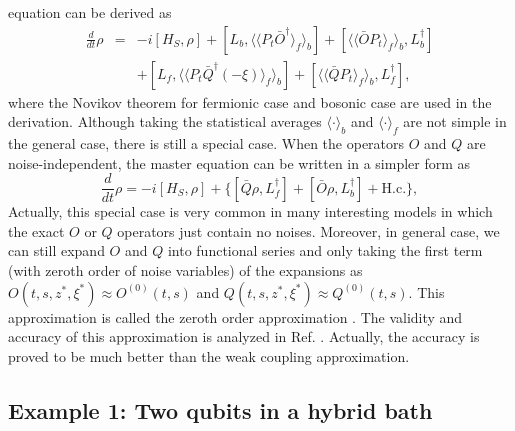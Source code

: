 \documentclass[preprint]{elsarticle}
\begin{document}
equation can be derived as
\begin{eqnarray}
\frac{d}{dt}\rho & = & -i[H_{S},\rho]+[L_{b},\langle\langle P_{t}\bar{O}^{\dagger}\rangle_{f}\rangle_{b}]+[\langle\langle\bar{O}P_{t}\rangle_{f}\rangle_{b},L_{b}^{\dagger}]\nonumber \\
 &  & +[L_{f},\langle\langle P_{t}\bar{Q}^{\dagger}(-\xi)\rangle_{f}\rangle_{b}]+[\langle\langle\bar{Q}P_{t}\rangle_{f}\rangle_{b},L_{f}^{\dagger}], \label{MEQ1}
\end{eqnarray}
where the Novikov theorem for fermionic case \cite{ZhaoFB} and bosonic
case \cite{Yu1999} are used in the derivation. Although taking the
statistical averages $\langle\cdot\rangle_{b}$ and $\langle\cdot\rangle_{f}$
are not simple in the general case, there is still a special case.
When the operators $O$ and $Q$ are noise-independent, the master
equation can be written in a simpler form as
\begin{equation}
\frac{d}{dt}\rho=-i[H_{S},\rho]+\{[\bar{Q}\rho,L_{f}^{\dagger}]+[\bar{O}\rho,L_{b}^{\dagger}]+\mathrm{H.c.}\},\label{eq:MEQ2}
\end{equation}
Actually, this special case is very common in many interesting models
\cite{QSD,ZhaoFB,Yu1999,Ncavity} in which the exact $O$ or $Q$
operators just contain no noises. Moreover, in general case, we can
still expand $O$ and $Q$ into functional series and only taking
the first term (with zeroth order of noise variables) of the expansions
as $O(t,s,z^{*},\xi^{*})\approx O^{(0)}(t,s)$ and $Q(t,s,z^{*},\xi^{*})\approx Q^{(0)}(t,s)$.
This approximation is called the zeroth order approximation \cite{Yu1999}.
The validity and accuracy of this approximation is analyzed in Ref.
\cite{Xu2014}. Actually, the accuracy is proved to be much better
than the weak coupling approximation.


\subsection{Example 1: Two qubits in a hybrid bath}
\end{document}
